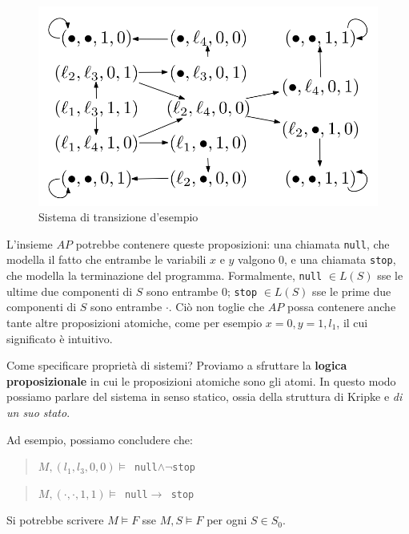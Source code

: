 \documentclass{article}
\begin{document}
\begin{figure}[!ht]
    \centering
    \includegraphics[width=\textwidth]{kripke.png}
    \caption{Sistema di transizione d'esempio}
    \label{fig:kripke}
\end{figure}

\bigskip

L'insieme $AP$ potrebbe contenere queste proposizioni: una chiamata \verb|null|, che modella il fatto che entrambe le variabili $x$ e $y$ valgono 0, e una chiamata \verb|stop|, che modella la terminazione del programma. Formalmente, \verb|null| $\in L(S)$ sse le ultime due componenti di $S$ sono entrambe 0; \verb|stop| $\in L(S)$ sse le prime due componenti di $S$ sono entrambe $\cdot$. Ciò non toglie che $AP$ possa contenere anche tante altre proposizioni atomiche, come per esempio $x=0,y=1,l_1$, il cui significato è intuitivo.

\bigskip

Come specificare proprietà di sistemi? Proviamo a sfruttare la \textbf{logica proposizionale} in cui le proposizioni atomiche sono gli atomi. In questo modo possiamo parlare del sistema in senso statico, ossia della struttura di Kripke e \textit{di un suo stato}.

\bigskip

Ad esempio, possiamo concludere che:

\begin{quote}
    $M,(l_1,l_3,0,0)\vDash$\verb| null|$\land\lnot$\verb|stop|
\end{quote}
\begin{quote}
    $M,(\cdot,\cdot,1,1)\vDash$\verb| null|$\to$\verb| stop|
\end{quote}

Si potrebbe scrivere $M\vDash F$ sse $M,S\vDash F$ per ogni $S\in S_0$.
\end{document}
